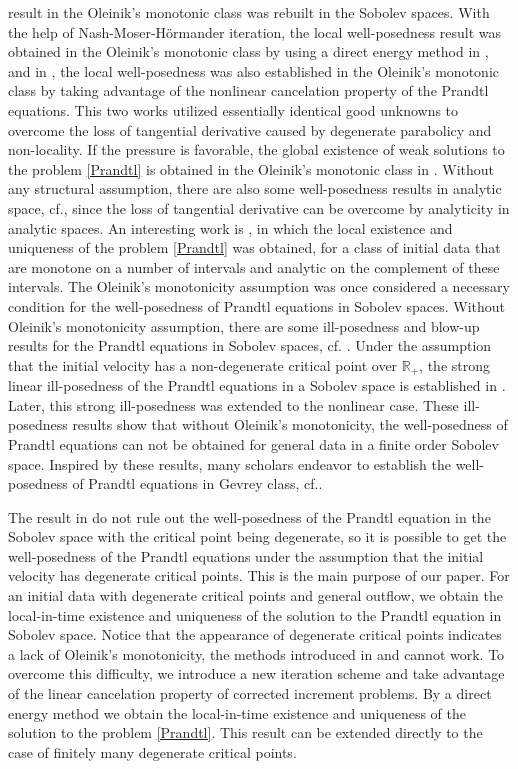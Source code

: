 \documentclass{amsart}
\numberwithin{equation}{section}
\begin{document}
result in the Oleinik's monotonic class was rebuilt in the Sobolev spaces. With the help of Nash-Moser-H\"{o}rmander iteration, the local well-posedness result was obtained in the Oleinik's monotonic class by using a direct energy method in \cite{AWXY}, and in \cite{MW}, the local well-posedness was also established in the Oleinik's monotonic class by taking advantage of the nonlinear cancelation property of the Prandtl equations. This two works utilized essentially identical good unknowns to overcome the loss of tangential derivative caused by degenerate parabolicy and non-locality. If the pressure is favorable, the global existence of  weak solutions to the problem \eqref{Prandtl} is obtained in the Oleinik's monotonic class in \cite{XZ}. Without any structural assumption, there are also some well-posedness results in analytic space, cf.\cite{LCS,KV,IV,SC1,ZZ}, since the loss of tangential derivative can be overcome by analyticity in  analytic spaces. An interesting work is \cite{KMVW}, in which the local existence and uniqueness of the problem \eqref{Prandtl} was obtained, for a class of initial data that are monotone on a number of intervals and analytic on the complement of these intervals.
The Oleinik's monotonicity assumption was once considered a necessary condition for the well-posedness of Prandtl equations in Sobolev spaces. Without Oleinik's monotonicity assumption, there are some ill-posedness and blow-up results for the Prandtl equations in Sobolev spaces, cf. \cite{EE,GD,G-N,GN-1,KVW,LY2}. Under the assumption that the initial velocity has a non-degenerate critical point over $\mathbb{R}_{+}$, the strong linear ill-posedness of the Prandtl equations in a Sobolev space is established in \cite{GD}. Later, this strong ill-posedness was extended to the  nonlinear case. These ill-posedness results show that without Oleinik's monotonicity, the well-posedness of Prandtl equations can not be obtained for general data in a finite order Sobolev space. Inspired by these results, many scholars endeavor to establish the well-posedness of Prandtl equations in Gevrey class, cf.\cite{DG,GM,LY,LWX}.

The result in \cite{GD} do not rule out the well-posedness of the Prandtl equation in the Sobolev space with the critical point being degenerate, so it is possible to get the well-posedness of the Prandtl equations under the assumption that the initial velocity has degenerate critical points.  This is the main purpose of our paper. For an initial data with degenerate critical points and general outflow, we obtain the local-in-time existence and uniqueness of the solution to the Prandtl equation in Sobolev space. Notice that the appearance of degenerate critical points indicates a lack of Oleinik's monotonicity, the methods introduced in \cite{AWXY} and \cite{MW} cannot work. To overcome this difficulty, we introduce a new iteration scheme and take advantage of the linear cancelation property of corrected increment problems. By a direct energy method we obtain the local-in-time existence and uniqueness of the solution to the problem \eqref{Prandtl}. This result can be extended directly to the case of finitely many degenerate critical points.
\end{document}
